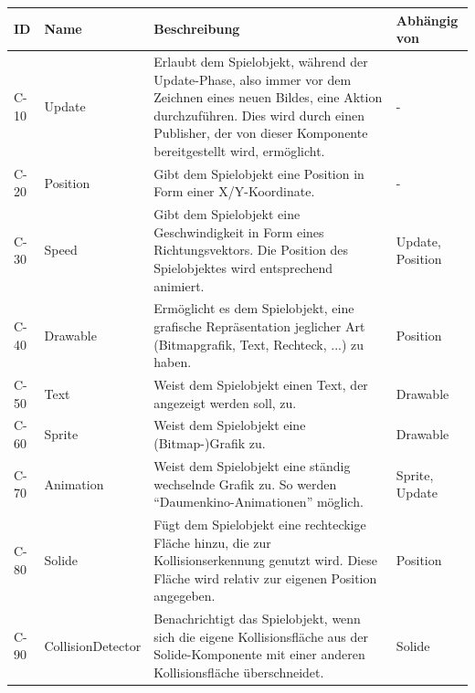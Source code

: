 		\begin{longtable}{|l|p{3cm}|p{6cm}|p{3cm}|}
			\hline
			\textbf{ID} 
				& \textbf{Name} 
					& \textbf{Beschreibung} 
						& \textbf{Abhängig von}
			\\ \hline

			C-10 	& Update 
					& Erlaubt dem Spielobjekt, während der Update-Phase, also immer vor dem Zeichnen eines neuen Bildes, eine Aktion durchzuführen. Dies wird durch einen Publisher, der von dieser Komponente bereitgestellt wird, ermöglicht.
						& -

			\\ \hline

			C-20 	& Position 
					& Gibt dem Spielobjekt eine Position in Form einer X/Y-Koordinate.
						& -
			\\ \hline

			C-30 	& Speed 
					& Gibt dem Spielobjekt eine Geschwindigkeit in Form eines Richtungsvektors. Die Position des Spielobjektes wird entsprechend animiert.
						& Update, Position
			\\ \hline

			C-40 	& Drawable 
					& Ermöglicht es dem Spielobjekt, eine grafische Repräsentation jeglicher Art (Bitmapgrafik, Text, Rechteck, ...)  zu haben.
						& Position 
			\\ \hline

			C-50 	& Text 	
					& Weist dem Spielobjekt einen Text, der angezeigt werden soll, zu.
						& Drawable
			\\ \hline

			C-60 	& Sprite 
					& Weist dem Spielobjekt eine (Bitmap-)Grafik zu.
						& Drawable 
			\\ \hline 

			C-70 	& Animation
					& Weist dem Spielobjekt eine ständig wechselnde Grafik zu. So werden \enquote{Daumenkino-Animationen} möglich.
						& Sprite, Update 

			\\ \hline 

			C-80 	& Solide
					& Fügt dem Spielobjekt eine rechteckige Fläche hinzu, die zur Kollisionserkennung genutzt wird. Diese Fläche wird relativ zur eigenen Position angegeben.
						& Position
			\\ \hline

			C-90 	& CollisionDetector
					& Benachrichtigt das Spielobjekt, wenn sich die eigene Kollisionsfläche aus der Solide-Komponente mit einer anderen Kollisionsfläche überschneidet.
						& Solide
			\\ \hline


\end{longtable}

